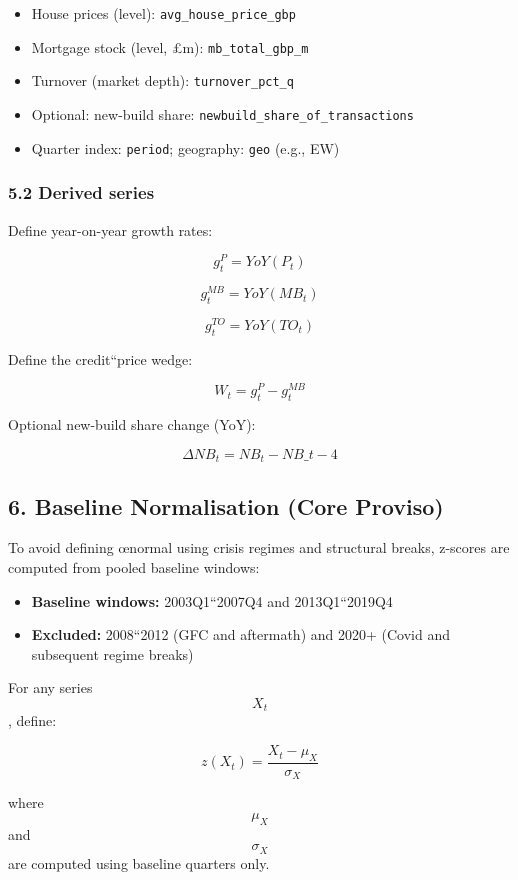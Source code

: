 \documentclass[
]{article}
\providecommand{\tightlist}{%
  \setlength{\itemsep}{0pt}\setlength{\parskip}{0pt}}
\begin{document}
\begin{itemize}
\tightlist
\item
  House prices (level): \texttt{avg\_house\_price\_gbp}
\item
  Mortgage stock (level, £m): \texttt{mb\_total\_gbp\_m}
\item
  Turnover (market depth): \texttt{turnover\_pct\_q}
\item
  Optional: new-build share: \texttt{newbuild\_share\_of\_transactions}
\item
  Quarter index: \texttt{period}; geography: \texttt{geo} (e.g., EW)
\end{itemize}

\subsubsection{5.2 Derived series}\label{derived-series}

Define year-on-year growth rates:

\[ g_t^P = YoY(P_t) \]

\[ g_t^{MB} = YoY(MB_t) \]

\[ g_t^{TO} = YoY(TO_t) \]

Define the credit``price wedge:

\[ W_t = g_t^P - g_t^{MB} \]

Optional new-build share change (YoY):

\[ \Delta NB_t = NB_t - NB\_{t-4} \]

\subsection{6. Baseline Normalisation (Core
Proviso)}\label{baseline-normalisation-core-proviso}

To avoid defining œnormal using crisis regimes and structural breaks,
z-scores are computed from pooled baseline windows:

\begin{itemize}
\tightlist
\item
  \textbf{Baseline windows:} 2003Q1``2007Q4 and 2013Q1``2019Q4
\item
  \textbf{Excluded:} 2008``2012 (GFC and aftermath) and 2020+ (Covid and
  subsequent regime breaks)
\end{itemize}

For any series \[X_t\], define:

\[ z(X_t) = \frac{X_t - \mu_X}{\sigma_X} \]

where \[\mu_X\] and \[\sigma_X\] are computed using baseline quarters
only.
\end{document}
